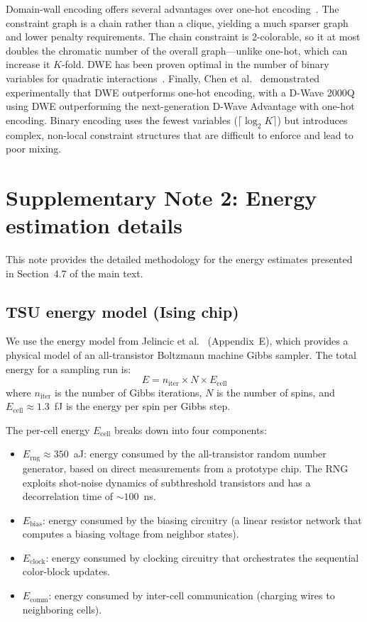 \documentclass[11pt]{article}
\begin{document}
Domain-wall encoding offers several advantages over one-hot encoding~\cite{chancellor2019dwc, berwald2022dwc, chen2021dwc}.
The constraint graph is a chain rather than a clique, yielding a much sparser graph and lower penalty requirements.
The chain constraint is 2-colorable, so it at most doubles the chromatic number of the overall graph---unlike one-hot, which can increase it $K$-fold.
DWE has been proven optimal in the number of binary variables for quadratic interactions~\cite{berwald2022dwc}.
Finally, Chen et al.~\cite{chen2021dwc} demonstrated experimentally that DWE outperforms one-hot encoding, with a D-Wave 2000Q using DWE outperforming the next-generation D-Wave Advantage with one-hot encoding.
Binary encoding uses the fewest variables ($\lceil\log_2 K\rceil$) but introduces complex, non-local constraint structures that are difficult to enforce and lead to poor mixing.

\section*{Supplementary Note 2: Energy estimation details}

This note provides the detailed methodology for the energy estimates presented in Section~4.7 of the main text.

\subsection*{TSU energy model (Ising chip)}

We use the energy model from Jelincic et al.~\cite{jelincic2025dtm} (Appendix~E), which provides a physical model of an all-transistor Boltzmann machine Gibbs sampler.
The total energy for a sampling run is:
\begin{equation}\label{eq:ising-energy}
  E = n_{\mathrm{iter}} \times N \times E_{\mathrm{cell}}
\end{equation}
where $n_{\mathrm{iter}}$ is the number of Gibbs iterations, $N$ is the number of spins, and $E_{\mathrm{cell}} \approx 1.3$~fJ is the energy per spin per Gibbs step.

The per-cell energy $E_{\mathrm{cell}}$ breaks down into four components:
\begin{itemize}
  \item $E_{\mathrm{rng}} \approx 350$~aJ: energy consumed by the all-transistor random number generator, based on direct measurements from a prototype chip. The RNG exploits shot-noise dynamics of subthreshold transistors and has a decorrelation time of ${\sim}100$~ns.
  \item $E_{\mathrm{bias}}$: energy consumed by the biasing circuitry (a linear resistor network that computes a biasing voltage from neighbor states).
  \item $E_{\mathrm{clock}}$: energy consumed by clocking circuitry that orchestrates the sequential color-block updates.
  \item $E_{\mathrm{comm}}$: energy consumed by inter-cell communication (charging wires to neighboring cells).
\end{itemize}
\end{document}

